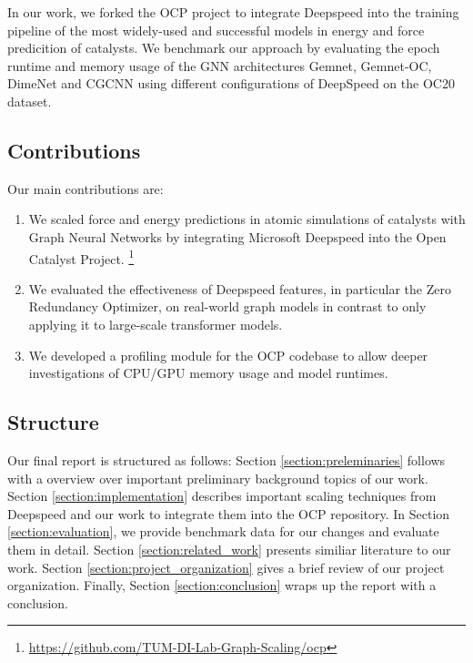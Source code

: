 In our work, we forked the OCP project to integrate Deepspeed into the training pipeline of the most widely-used 
and successful models in energy and force predicition of catalysts. 
We benchmark our approach by evaluating the epoch runtime and memory usage of the GNN architectures Gemnet, Gemnet-OC, 
DimeNet and CGCNN using different configurations of DeepSpeed on the OC20 dataset.


\subsection{Contributions}

Our main contributions are:

\begin{enumerate}
    \item We scaled force and energy predictions in atomic simulations of catalysts with Graph Neural Networks 
    by integrating Microsoft Deepspeed into the Open Catalyst Project.
    \footnote{\url{https://github.com/TUM-DI-Lab-Graph-Scaling/ocp}}
    \item We evaluated the effectiveness of Deepspeed features, in particular the Zero Redundancy Optimizer, on 
    real-world graph models in contrast to only applying it to large-scale transformer models.
    \item We developed a profiling module for the OCP codebase to allow deeper investigations of CPU/GPU memory 
    usage and model runtimes.
\end{enumerate}

\subsection{Structure}

Our final report is structured as follows: Section \ref*{section:preleminaries} follows with a overview over 
important preliminary background topics of our work. Section \ref*{section:implementation} describes important 
scaling techniques from Deepspeed and our work to integrate them into the OCP repository. In Section 
\ref*{section:evaluation}, we provide benchmark data for our changes and evaluate them in detail. Section 
\ref*{section:related_work} presents similiar literature to our work. Section \ref*{section:project_organization} 
gives a brief review of our project organization. Finally, Section \ref*{section:conclusion} wraps up the 
report with a conclusion.